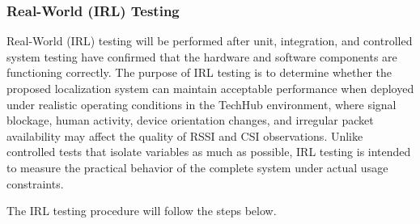 \subsubsection{Real-World (IRL) Testing}

Real-World (IRL) testing will be performed after unit, integration, and controlled system testing have confirmed that the hardware and software components are functioning correctly. The purpose of IRL testing is to determine whether the proposed localization system can maintain acceptable performance when deployed under realistic operating conditions in the TechHub environment, where signal blockage, human activity, device orientation changes, and irregular packet availability may affect the quality of RSSI and CSI observations. Unlike controlled tests that isolate variables as much as possible, IRL testing is intended to measure the practical behavior of the complete system under actual usage constraints.

The IRL testing procedure will follow the steps below.

